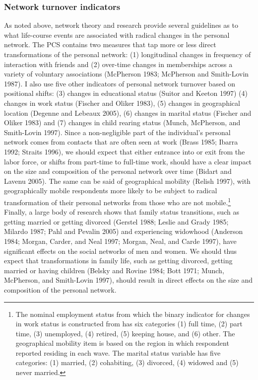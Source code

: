 \documentclass[
]{article}
\begin{document}
\subsubsection{Network turnover indicators}\label{network-turnover-indicators}

As noted above, network theory and research provide several guidelines as to what life-course events are associated with radical changes in the personal network. The PCS contains two measures that tap more or less direct transformations of the personal network: (1) longitudinal changes in frequency of interaction with friends and (2) over-time changes in memberships across a variety of voluntary associations (McPherson 1983; McPherson and Smith-Lovin 1987). I also use five other indicators of personal network turnover based on positional shifts: (3) changes in educational status (Suitor and Keeton 1997) (4) changes in work status (Fischer and Oliker 1983), (5) changes in geographical location (Degenne and Lebeaux 2005), (6) changes in marital status (Fischer and Oliker 1983) and (7) changes in child rearing status (Munch, McPherson, and Smith-Lovin 1997). Since a non-negligible part of the individual's personal network comes from contacts that are often seen at work (Brass 1985; Ibarra 1992; Straits 1996), we should expect that either entrance into or exit from the labor force, or shifts from part-time to full-time work, should have a clear impact on the size and composition of the personal network over time (Bidart and Lavenu 2005). The same can be said of geographical mobility (Relish 1997), with geographically mobile respondents more likely to be subject to radical transformation of their personal networks from those who are not mobile.\footnote{The nominal employment status from which the binary indicator for changes in work status is constructed from has six categories (1) full time, (2) part time, (3) unemployed, (4) retired, (5) keeping house, and (6) other. The geographical mobility item is based on the region in which respondent reported residing in each wave. The marital status variable has five categories: (1) married, (2) cohabiting, (3) divorced, (4) widowed and (5) never married.} Finally, a large body of research shows that family status transitions, such as getting married or getting divorced (Gerstel 1988; Leslie and Grady 1985; Milardo 1987; Pahl and Pevalin 2005) and experiencing widowhood (Anderson 1984; Morgan, Carder, and Neal 1997; Morgan, Neal, and Carde 1997), have significant effects on the social networks of men and women. We should thus expect that transformations in family life, such as getting divorced, getting married or having children (Belsky and Rovine 1984; Bott 1971; Munch, McPherson, and Smith-Lovin 1997), should result in direct effects on the size and composition of the personal network.
\end{document}
